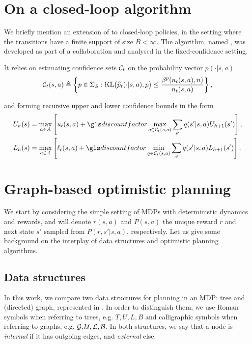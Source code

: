 \section{On a closed-loop algorithm}

We briefly mention an extension of \KLOLOP to closed-loop policies, in the setting where the transitions have a finite support of size $B < \infty$. The algorithm, named \MDPGapE, was developed as part of a collaboration \citep{jonsson2020planning} and analysed in the fixed-confidence setting.

It relies on estimating confidence sets $\mathcal{C}_t$ on the probability vector $p(\cdot|s,a)$
$$\cC_t(s,a) \eqdef \left\{p\in \Sigma_S :  \KL\!\big(\hp_t(\cdot|s,a),p\big) \leq \frac {\beta^p(n_t(s,a), n)} {n_t(s,a)}\right\},$$

and forming recursive upper and lower confidence bounds in the form
\begin{align*}
U_{h}(s) &= \max_{a\in A} \left[u_t(s,a) + \discount \max_{q \in \cC_t(s,a)} \sum_{s'} q(s'|s,a) U_{h+1}(s')\right], \\
L_{h}(s) &= \max_{a\in A} \left[\ell_t(s,a) + \discount \min_{q \in \cC_t(s,a)} \sum_{s'} q(s'|s,a)L_{h+1}(s')\right].
\end{align*}

\section{Graph-based optimistic planning}
\label{sec:gbopd}

We start by considering the simple setting of MDPs with deterministic dynamics and rewards, and will denote $r(s,a)$ and $P(s,a)$ the unique reward $r$ and next state $s'$ sampled from $P\left(r,s'|s,a\right)$, respectively.
Let us give some background on the interplay of data structures and optimistic planning algorithms.

\subsection{Data structures}

In this work, we compare two data structures for planning in an MDP: tree and (directed) graph, represented in . In order to distinguish them, we use Roman symbols when referring to trees, e.g. $T, U, L, B$ and calligraphic symbols when referring to graphs, e.g. $\mathcal{G}, \mathcal{U}, \mathcal{L}, \mathcal{B}$. In both structures, we say that a node is \emph{internal} if it has outgoing edges, and \emph{external} else.

